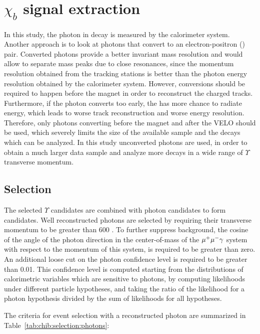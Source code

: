 \section{\texorpdfstring{$\chi_b$}{xb} signal extraction}
\label{sec:chib}

In this study, the photon in \chib decay is measured by the calorimeter system.
Another approach is to look at photons that convert to an electron-positron
(\epem) pair. Converted photons provide a better invariant mass resolution and would 
allow to separate mass peaks due to close resonances, since the 
\epm momentum 
resolution obtained from the tracking stations is better than the photon energy resolution obtained
by the calorimeter system. However, conversions should be required to happen before the magnet in
order to reconstruct the charged tracks. Furthermore, if the photon converts too
early, the \epm has more chance to radiate energy, which leads to worse
track reconstruction and worse energy resolution. Therefore, only photons
converting before the magnet and after the VELO should be used, which severely limits 
the size of the available sample and the decays which can be analyzed. In this study 
unconverted photons are used, in order to obtain a much larger data sample and 
analyze more decays in a wide range of $\Upsilon$ transverse momentum. 

\subsection{Selection}
\label{sec:chib:selection}

The selected $\Upsilon$ candidates  are combined with photon candidates to form
\chib candidates. Well reconstructed photons are selected by requiring their 
transverse momentum to be greater than 600 \mevc. To further suppress background, 
the cosine of the angle of the photon direction in the center-of-mass of the
$\mu^+\mu^-\gamma$ system with respect to the momentum of this system, is required to
be greater than zero. An additional loose cut on the photon confidence level is
required to be greater than 0.01. This confidence level is computed starting from the distributions 
of calorimetric variables which are sensitive to photons, by computing likelihoods under different particle 
hypotheses, and taking   
the ratio of the likelihood for a photon hypothesis divided by the sum of likelihoods for all hypotheses. 

The criteria for event selection with a reconstructed photon are summarized in
Table~\ref{tab:chib:selection:photons}:

